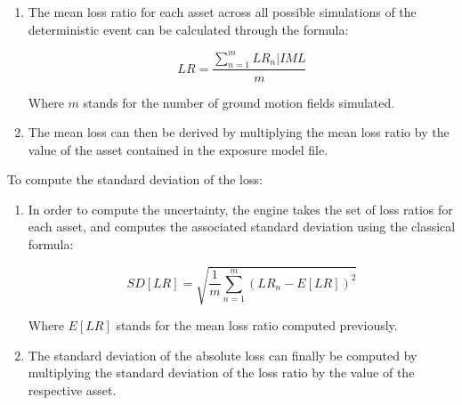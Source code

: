 \begin{enumerate}
\item The mean loss ratio for each asset across all possible simulations of the deterministic event can be calculated through the formula:

\begin{equation}
LR=\frac{\sum^m_{n=1}LR_n|IML}{m}
\end{equation}

Where $m$ stands for the number of ground motion fields simulated.

\item The mean loss can then be derived by multiplying the mean loss ratio by the value of the asset contained in the exposure model file.

\end{enumerate}

To compute the standard deviation of the loss:

\begin{enumerate}

\item In order to compute the uncertainty, the engine takes the set of loss ratios for each asset, and computes the associated standard deviation using the classical formula:

\begin{equation}
SD[LR]=\sqrt{  \frac{1}{m}\sum_{n=1}^m{(LR_n-E[LR])^2} }
\end{equation}

Where $E[LR]$ stands for the mean loss ratio computed previously.

\item The standard deviation of the absolute loss can finally be computed by multiplying the standard deviation of the loss ratio by the value of the respective asset.

\end{enumerate}

